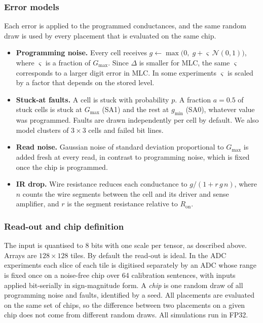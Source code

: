 \documentclass[conference]{IEEEtran}
\begin{document}
\subsubsection{Error models}
Each error is applied to the programmed conductances, and the same random draw is used by every placement
that is evaluated on the same chip.
\begin{itemize}
\item \textbf{Programming noise.} Every cell receives $g \leftarrow \max\!\big(0,\;g+\varsigma\,\mathcal{N}(0,1)\big)$,
where $\varsigma$ is a fraction of $G_{\max}$. Since $\Delta$ is smaller for MLC, the same $\varsigma$
corresponds to a larger digit error in MLC. In some experiments $\varsigma$ is scaled by a factor that
depends on the stored level.
\item \textbf{Stuck-at faults.} A cell is stuck with probability $p$. A fraction $a=0.5$ of stuck cells is
stuck at $G_{\max}$ (SA1) and the rest at $g_{\min}$ (SA0), whatever value was programmed. Faults are drawn
independently per cell by default. We also model clusters of $3\times3$ cells and failed bit lines.
\item \textbf{Read noise.} Gaussian noise of standard deviation proportional to $G_{\max}$ is added fresh at
every read, in contrast to programming noise, which is fixed once the chip is programmed.
\item \textbf{IR drop.} Wire resistance reduces each conductance to $g/(1+r\,g\,n)$, where $n$ counts the wire
segments between the cell and its driver and sense amplifier, and $r$ is the segment resistance relative to
$R_{\mathrm{on}}$.
\end{itemize}

\subsubsection{Read-out and chip definition}
The input is quantised to 8 bits with one scale per tensor, as described above. Arrays are $128\times128$
tiles. By default the read-out is ideal. In the ADC experiments each slice of each tile is digitised
separately by an ADC whose range is fixed once on a noise-free chip over 64 calibration sentences, with
inputs applied bit-serially in sign-magnitude form. A \emph{chip} is one random draw of all programming
noise and faults, identified by a seed. All placements are evaluated on the same set of chips, so the
difference between two placements on a given chip does not come from different random draws. All
simulations run in FP32.
\end{document}
